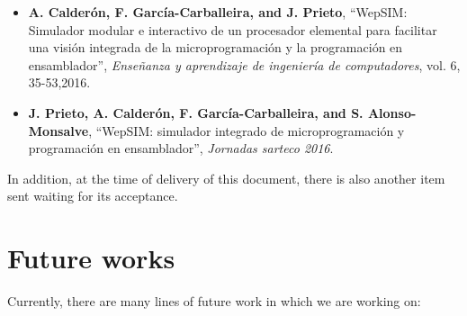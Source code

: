 \begin{itemize}

\item \textbf{A. Calderón, F. García-Carballeira, and J. Prieto}, “WepSIM: Simulador modular e interactivo de un procesador elemental para facilitar una visión integrada de la microprogramación y la programación en ensamblador”, \textit{Enseñanza y aprendizaje de ingeniería de computadores}, vol. 6, 35-53,2016. \cite{mateos2016wepsim}

\item \textbf{J. Prieto, A. Calderón, F. García-Carballeira, and S. Alonso-Monsalve}, “WepSIM: simulador integrado de microprogramación y programación en ensamblador”, \textit{Jornadas sarteco 2016}. \cite{arcos2032}

\end{itemize}

In addition, at the time of delivery of this document, there is also another item sent waiting for its acceptance.

\vspace{1cm}

\section*{Future works}

Currently, there are many lines of future work in which we are working on:

